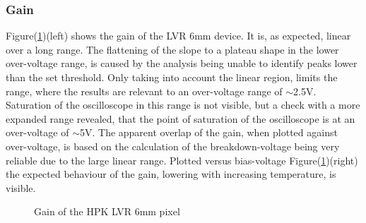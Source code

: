 \documentclass[12pt,article,type=msc,colorback,accentcolor=tud9c]{tudthesis}
\begin{document}
\subsubsection{Gain}
\label{subsubsec:LVR6Gain}
Figure(\ref{fig:LVR6_Gain})(left) shows the gain of the LVR 6mm device. It is, as expected, linear over a long range. The flattening of the slope to a plateau shape in the lower over-voltage range, is caused by the analysis being unable to identify peaks lower than the set threshold. Only taking into account the linear region, limits the range, where the results are relevant to an over-voltage range of $\sim$2.5V. Saturation of the oscilloscope in this range is not visible, but a check with a more expanded range revealed, that the point of saturation of the oscilloscope is at an over-voltage of $\sim$5V. The apparent overlap of the gain, when plotted against over-voltage, is based on the calculation of the breakdown-voltage being very reliable due to the large linear range. Plotted versus bias-voltage Figure(\ref{fig:LVR6_Gain})(right) the expected behaviour of the gain, lowering with increasing temperature, is visible. 
\begin{figure}[h]
\begin{centering}
\caption{Gain of the HPK LVR 6mm pixel}
\label{fig:LVR6_Gain}
\end{centering}
\end{figure}
\end{document}
